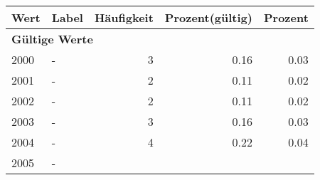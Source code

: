      \begin{longtable}{lXrrr}
     \toprule
     \textbf{Wert} & \textbf{Label} & \textbf{Häufigkeit} & \textbf{Prozent(gültig)} & \textbf{Prozent} \\
     \endhead
     \midrule
     \multicolumn{5}{l}{\textbf{Gültige Werte}}\\

     2000 &
     \multicolumn{1}{X}{ -  } &


       \num{3} &
       \num[round-mode=places,round-precision=2]{0.16} &
         \num[round-mode=places,round-precision=2]{0.03} \\

     2001 &
     \multicolumn{1}{X}{ -  } &


       \num{2} &
       \num[round-mode=places,round-precision=2]{0.11} &
         \num[round-mode=places,round-precision=2]{0.02} \\

     2002 &
     \multicolumn{1}{X}{ -  } &


       \num{2} &
       \num[round-mode=places,round-precision=2]{0.11} &
         \num[round-mode=places,round-precision=2]{0.02} \\

     2003 &
     \multicolumn{1}{X}{ -  } &


       \num{3} &
       \num[round-mode=places,round-precision=2]{0.16} &
         \num[round-mode=places,round-precision=2]{0.03} \\

     2004 &
     \multicolumn{1}{X}{ -  } &


       \num{4} &
       \num[round-mode=places,round-precision=2]{0.22} &
         \num[round-mode=places,round-precision=2]{0.04} \\

     2005 &
     \multicolumn{1}{X}{ -  } &



\end{longtable}
